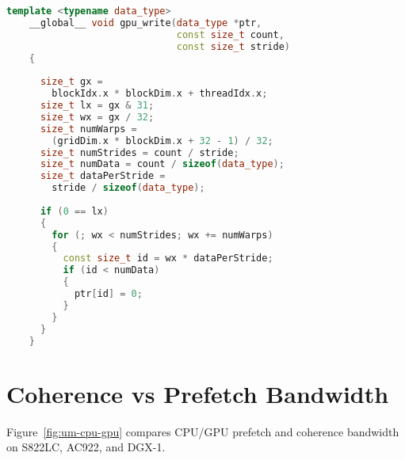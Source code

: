 \begin{lstlisting}[language=c++, caption=\texttt{gpu\_write} function., label=lst:gpu-write]
    template <typename data_type>
    __global__ void gpu_write(data_type *ptr,
                              const size_t count,
                              const size_t stride)
    {
    
      size_t gx = 
        blockIdx.x * blockDim.x + threadIdx.x;
      size_t lx = gx & 31;
      size_t wx = gx / 32;
      size_t numWarps = 
        (gridDim.x * blockDim.x + 32 - 1) / 32;
      size_t numStrides = count / stride;
      size_t numData = count / sizeof(data_type);
      size_t dataPerStride = 
        stride / sizeof(data_type);
    
      if (0 == lx)
      {
        for (; wx < numStrides; wx += numWarps)
        {
          const size_t id = wx * dataPerStride;
          if (id < numData)
          {
            ptr[id] = 0;
          }
        }
      }
    }
\end{lstlisting}

%
%
%
\section{Coherence vs Prefetch Bandwidth}
\label{sec:um-coherence-prefetch}

Figure~\ref{fig:um-cpu-gpu} compares CPU/GPU prefetch and coherence bandwidth on S822LC, AC922, and DGX-1.

